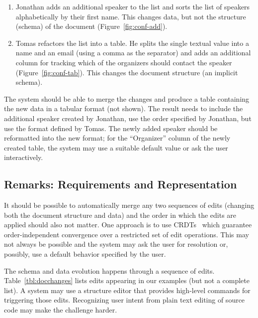 \documentclass[english,crc]{programming}
\begin{document}
\begin{enumerate}
\item Jonathan adds an additional speaker to the list and sorts the list of speakers
  alphabetically by their first name. This changes data, but not the structure (schema) of
  the document (Figure~\ref{fig:conf-add}).
\item Tomas refactors the list into a table. He splits the single textual value
  into a name and an email (using a comma as the separator) and adds an additional column for
  tracking which of the organizers should contact the speaker (Figure~\ref{fig:conf-tab}).
  This changes the document structure (an implicit schema).
\end{enumerate}

\noindent
The system should be able to merge the changes and produce a table containing the new data
in a tabular format (not shown). The result needs to include the additional speaker
created by Jonathan, use the order specified by Jonathan, but use the format defined by
Tomas. The newly added speaker should be reformatted into the new format; for the
``Organizer'' column of the newly created table, the system may use a suitable default value
or ask the user interactively.

\subsection*{Remarks: Requirements and Representation}
It should be possible to automatically merge any two sequences of edits (changing both
the document structure and data) and the order in which the edits are applied should also not
matter. One approach is to use CRDTs~\cite{Shapiro11} which guarantee order-independent convergence over a restricted set of edit operations. This may not always be possible and the system may ask the user for resolution or,
possibly, use a default behavior specified by the user.

The schema and data evolution happens through a sequence of edits. Table~\ref{tbl:docchanges}
lists edits appearing in our examples (but not a complete list). A system may
use a structure editor that provides high-level commands for triggering those edits.
Recognizing user intent from plain text editing of source code may make the challenge harder.
\end{document}
